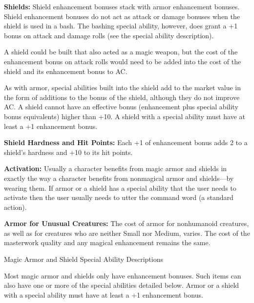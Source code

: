 \documentclass{article}
\begin{document}
\textbf{Shields:} Shield enhancement bonuses stack with armor enhancement bonuses. 
Shield enhancement bonuses do not act as attack or damage bonuses when the shield 
is used in a bash. The bashing special ability, however, does grant a +1 bonus 
on attack and damage rolls (see the special ability description).

A shield could be built that also acted as a magic weapon, but the cost of the 
enhancement bonus on attack rolls would need to be added into the cost of the shield 
and its enhancement bonus to AC.

As with armor, special abilities built into the shield add to the market value 
in the form of additions to the bonus of the shield, although they do not improve 
AC. A shield cannot have an effective bonus (enhancement plus special ability bonus 
equivalents) higher than +10. A shield with a special ability must have at least 
a +1 enhancement bonus.

\textbf{Shield Hardness and Hit Points:} Each +1 of enhancement bonus adds 2 to 
a shield's hardness and +10 to its hit points.

\textbf{Activation:} Usually a character benefits from magic armor and shields 
in exactly the way a character benefits from nonmagical armor and shields---by 
wearing them. If armor or a shield has a special ability that the user needs to 
activate then the user usually needs to utter the command word (a standard action).

\textbf{Armor for Unusual Creatures: }The cost of armor for nonhumanoid creatures, 
as well as for creatures who are neither Small nor Medium, varies\textit{. }The 
cost of the masterwork quality and any magical enhancement remains the same.

\vspace{12pt}
Magic Armor and Shield Special Ability Descriptions

Most magic armor and shields only have enhancement bonuses. Such items can also 
have one or more of the special abilities detailed below. Armor or a shield with 
a special ability must have at least a +1 enhancement bonus.
\end{document}

